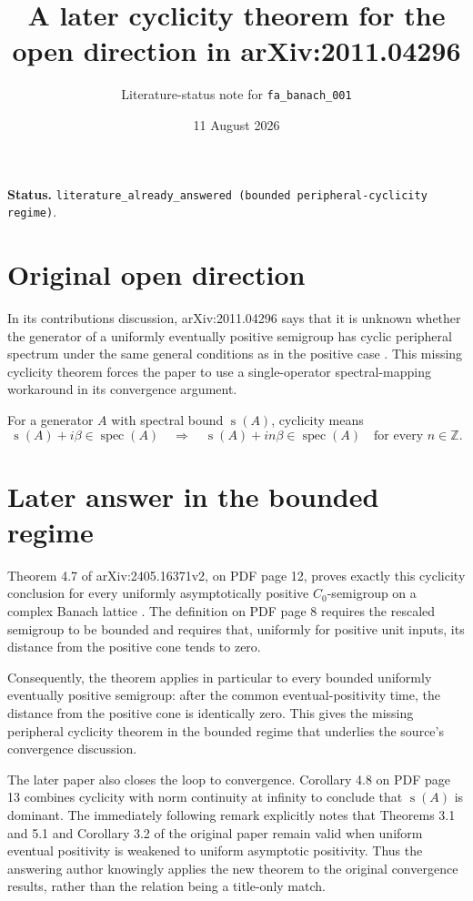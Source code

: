 \documentclass[11pt]{article}
\title{A later cyclicity theorem for the open direction in arXiv:2011.04296}
\author{Literature-status note for \texttt{fa\_banach\_001}}
\date{11 August 2026}
\newcommand{\spec}{\operatorname{spec}}
\newcommand{\sbound}{\operatorname{s}}
\begin{document}
\maketitle

\noindent\textbf{Status.}
\texttt{literature\_already\_answered (bounded peripheral-cyclicity regime)}.

\section*{Original open direction}

In its contributions discussion, arXiv:2011.04296 says that it is unknown
whether the generator of a uniformly eventually positive semigroup has cyclic
peripheral spectrum under the same general conditions as in the positive case
\cite[p.~2]{AroraGlueck2021}.  This missing cyclicity theorem forces the paper
to use a single-operator spectral-mapping workaround in its convergence
argument.

For a generator $A$ with spectral bound $\sbound(A)$, cyclicity means
\[
 \sbound(A)+i\beta\in\spec(A)
 \quad\Longrightarrow\quad
 \sbound(A)+in\beta\in\spec(A)
 \quad\text{for every }n\in\mathbb Z.
\]

\section*{Later answer in the bounded regime}

Theorem 4.7 of arXiv:2405.16371v2, on PDF page 12, proves exactly this
cyclicity conclusion for every uniformly asymptotically positive
$C_0$-semigroup on a complex Banach lattice \cite{Arora2025}.  The definition
on PDF page 8 requires the rescaled semigroup to be bounded and requires that,
uniformly for positive unit inputs, its distance from the positive cone tends
to zero.

Consequently, the theorem applies in particular to every bounded uniformly
eventually positive semigroup: after the common eventual-positivity time, the
distance from the positive cone is identically zero.  This gives the missing
peripheral cyclicity theorem in the bounded regime that underlies the source's
convergence discussion.

The later paper also closes the loop to convergence.  Corollary 4.8 on PDF
page 13 combines cyclicity with norm continuity at infinity to conclude that
$\sbound(A)$ is dominant.  The immediately following remark explicitly notes
that Theorems 3.1 and 5.1 and Corollary 3.2 of the original paper remain valid
when uniform eventual positivity is weakened to uniform asymptotic
positivity.  Thus the answering author knowingly applies the new theorem to
the original convergence results, rather than the relation being a title-only
match.
\end{document}
